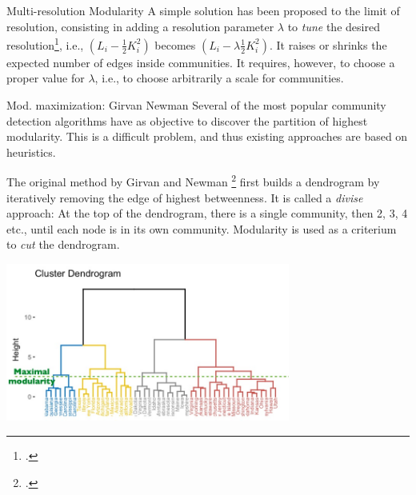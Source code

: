 \documentclass[a4paper,11pt]{book}
\begin{document}
\begin{textbox}{Multi-resolution Modularity}
A simple solution has been proposed to the limit of resolution, consisting in adding a resolution parameter $\lambda$ to \textit{tune} the desired resolution\footcite{reichardt2006statistical}, i.e., $(L_{i}-\frac{1}{2}K_i^2)$ becomes $(L_{i}-\lambda \frac{1}{2}K_i^2)$. It raises or shrinks the expected number of edges inside communities. It requires, however, to choose a proper value for $\lambda$, i.e., to choose arbitrarily a scale for communities.
\end{textbox}

\begin{textbox}{Mod. maximization: Girvan Newman}
Several of the most popular community detection algorithms have as objective to discover the partition of highest modularity. This is a difficult problem, and thus existing approaches are based on heuristics. 

The original method by Girvan and Newman \footcite{girvan2002community} first builds a dendrogram by iteratively removing the edge of highest betweenness. It is called a \textit{divise} approach: At the top of the dendrogram, there is a single community, then 2, 3, 4 etc., until each node is in its own community. Modularity is used as a criterium to \textit{cut} the dendrogram. 

\centering
\includegraphics[width=0.7\textwidth]{pics/dendrogram.jpg}

\end{textbox}
\end{document}
